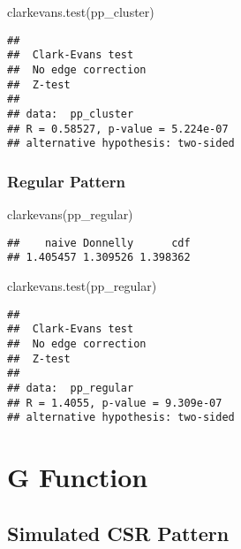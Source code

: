 \documentclass[
]{book}
\newenvironment{Shaded}{\begin{snugshade}}{\end{snugshade}}
\newcommand{\FunctionTok}[1]{\textcolor[rgb]{0.00,0.00,0.00}{#1}}
\newcommand{\NormalTok}[1]{#1}
\begin{document}
\begin{Shaded}
\begin{Highlighting}[]
\FunctionTok{clarkevans.test}\NormalTok{(pp\_cluster)}
\end{Highlighting}
\end{Shaded}

\begin{verbatim}
## 
##  Clark-Evans test
##  No edge correction
##  Z-test
## 
## data:  pp_cluster
## R = 0.58527, p-value = 5.224e-07
## alternative hypothesis: two-sided
\end{verbatim}

\hypertarget{regular-pattern-2}{%
\subsubsection{Regular Pattern}\label{regular-pattern-2}}

\begin{Shaded}
\begin{Highlighting}[]
\FunctionTok{clarkevans}\NormalTok{(pp\_regular)}
\end{Highlighting}
\end{Shaded}

\begin{verbatim}
##    naive Donnelly      cdf 
## 1.405457 1.309526 1.398362
\end{verbatim}

\begin{Shaded}
\begin{Highlighting}[]
\FunctionTok{clarkevans.test}\NormalTok{(pp\_regular)}
\end{Highlighting}
\end{Shaded}

\begin{verbatim}
## 
##  Clark-Evans test
##  No edge correction
##  Z-test
## 
## data:  pp_regular
## R = 1.4055, p-value = 9.309e-07
## alternative hypothesis: two-sided
\end{verbatim}

\hypertarget{g-function}{%
\section{G Function}\label{g-function}}

\hypertarget{simulated-csr-pattern-2}{%
\subsection{Simulated CSR Pattern}\label{simulated-csr-pattern-2}}
\end{document}
